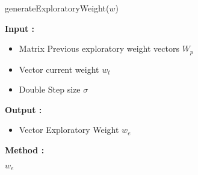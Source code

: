 \documentclass{acm_proc_article-sp}
\begin{document}
\begin{algorithm}[t]
\caption{generateExploratoryWeight($w$)}
\begin{spacing}{0.9}
\begin{algorithmic}
\STATE \textbf{Input :} \begin{itemize}
\item Matrix Previous exploratory weight vectors $W_p$ 
\item Vector current weight $w_t$
\item Double Step size $\sigma$
 \end{itemize}
\STATE \textbf{Output :} \begin{itemize}
\item Vector Exploratory Weight $w_e$
 \end{itemize}
\STATE \textbf{Method :}
\begin{enumerate}
\RETURN $w_e$
\end{enumerate}
\end{algorithmic}
\end{spacing}
\label{clicksimulate}
\end{algorithm}
\end{document}
